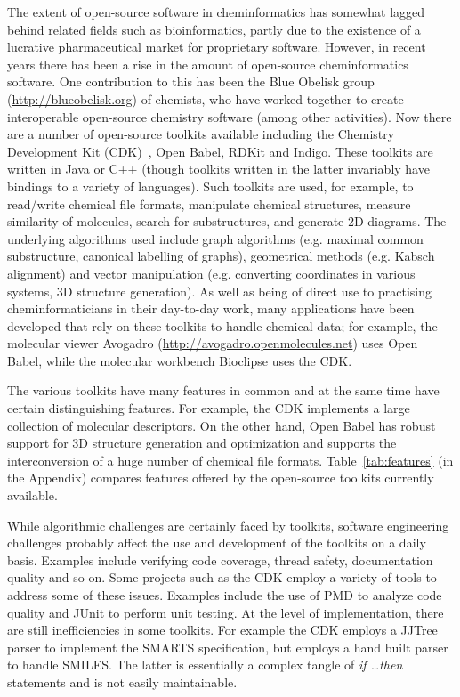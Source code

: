 \documentclass{sig-alternate}
\begin{document}
The extent of open-source software in cheminformatics has somewhat
lagged behind related fields such as bioinformatics, partly
due to the existence of a lucrative pharmaceutical market for
proprietary software. However, in recent years there has been a
rise in the amount of open-source cheminformatics software. One
contribution to this has been the Blue Obelisk group
(\url{http://blueobelisk.org}) of chemists, who have worked together to
create interoperable open-source chemistry software (among other
activities). Now there are a number of open-source toolkits available
including the Chemistry Development
Kit (CDK)~\cite{steinbeck2003}, Open Babel, RDKit and Indigo. These toolkits are written in
Java or C++ (though toolkits written in the latter invariably have
bindings to a variety of languages). Such toolkits are used, for
example, to read/write chemical file formats, manipulate chemical
structures, measure similarity of molecules, search for substructures,
and generate 2D diagrams. The underlying algorithms used include graph
algorithms (e.g. maximal common substructure, canonical labelling of
graphs), geometrical methods (e.g. Kabsch alignment) and vector
manipulation (e.g. converting coordinates in various systems, 3D
structure generation). As well as being of direct use to practising
cheminformaticians in their day-to-day work, many applications have
been developed that rely on these toolkits to handle chemical data;
for example, the molecular viewer Avogadro
(\url{http://avogadro.openmolecules.net}) uses Open Babel, while the
molecular workbench Bioclipse \cite{Bioclipse2} uses the CDK.

The various toolkits have many features in common and at the same time
have certain distinguishing features. For example, the CDK implements
a large collection of molecular descriptors. On the other hand,
Open Babel has robust support for 3D structure generation and
optimization and supports the interconversion of a huge number of
chemical file formats.  Table~\ref{tab:features} (in the Appendix) compares features offered by the open-source toolkits currently available.

While algorithmic challenges are certainly faced by toolkits, software
engineering challenges probably affect the use and development of the
toolkits on a daily basis. Examples include verifying code coverage,
thread safety, documentation quality and so on. Some projects such as
the CDK employ a variety of tools to address some of these issues.
Examples include the use of PMD to analyze code quality and JUnit to
perform unit testing. At the level of implementation, there are still
inefficiencies in some toolkits. For example the CDK employs a JJTree
parser to implement the SMARTS specification, but employs a hand built
parser to handle SMILES. The latter is essentially a complex tangle of
\emph{if \ldots then} statements and is not easily maintainable.
\end{document}
